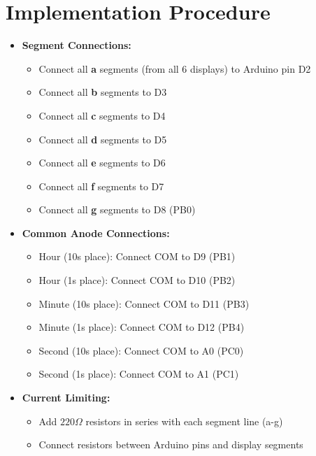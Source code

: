 \documentclass[journal]{IEEEtran}
\begin{document}
\section{Implementation Procedure}
\begin{itemize}
    \item \textbf{Segment Connections:}
    \begin{itemize}
        \item Connect all \textbf{a} segments (from all 6 displays) to Arduino pin D2
        \item Connect all \textbf{b} segments to D3
        \item Connect all \textbf{c} segments to D4
        \item Connect all \textbf{d} segments to D5
        \item Connect all \textbf{e} segments to D6
        \item Connect all \textbf{f} segments to D7
        \item Connect all \textbf{g} segments to D8 (PB0)
    \end{itemize}
    
    \item \textbf{Common Anode Connections:}
    \begin{itemize}
        \item Hour (10s place): Connect COM to D9 (PB1)
        \item Hour (1s place): Connect COM to D10 (PB2)
        \item Minute (10s place): Connect COM to D11 (PB3)
        \item Minute (1s place): Connect COM to D12 (PB4)
        \item Second (10s place): Connect COM to A0 (PC0)
        \item Second (1s place): Connect COM to A1 (PC1)
    \end{itemize}
    
    \item \textbf{Current Limiting:}
    \begin{itemize}
        \item Add $220\Omega$ resistors in series with each segment line (a-g)
        \item Connect resistors between Arduino pins and display segments
    \end{itemize}
    
\end{itemize}
\end{document}
